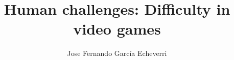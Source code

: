 \documentclass[a4paper,12pt,twoside]{report}
\begin{document}

\title{Human challenges: Difficulty in video games}
\author{Jose Fernando García Echeverri}

\maketitle

\restoregeometry

\preface
\cleardoublepage 
%
%


\body


% 
%
%





%
\end{document}
